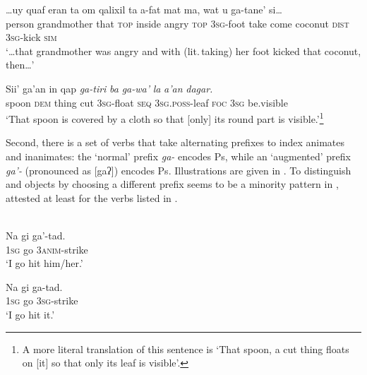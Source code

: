 \documentclass[output=paper]{LSP/langsci}
\begin{document}
\ex \label{03-kl-ex:12}
\gll \ldots uy quaf eran ta om qalixil ta\footnotemark {} a-fat mat ma, wat u ga-tane’ si\ldots \\
person grandmother that \textsc{top} inside angry \textsc{top} 3\textsc{sg}-foot take come coconut \textsc{dist} 3\textsc{sg}-kick \textsc{sim}\\
\clearpage
\glt ‘\ldots that grandmother was angry and with (lit.\,taking) her foot kicked that coconut, then\ldots’

\ex \label{03-kl-ex:13}
\gll Sii’ ga’an in qap \textit{ga-tiri} \textit{ba} \textit{ga-wa’} \textit{la} \textit{a’an} \textit{dagar.}\\
spoon \textsc{dem} thing cut 3\textsc{sg}-float \textsc{seq} 3\textsc{sg}.\textsc{poss}-leaf \textsc{foc} 3\textsc{sg} be.visible\\
\glt ‘That spoon is covered by a cloth so that [only] its round part is visible.’\footnote{A more literal translation of this sentence is ‘That spoon, a cut thing floats on [it] so that only its leaf is visible’.}
\z
\z

Second, there is a set of verbs that take alternating prefixes to index animates and inanimates: the ‘normal’ prefix \textit{ga-} encodes  Ps, while an ‘augmented’ prefix \textit{ga’-} (pronounced as [gaʔ]) encodes  Ps. 
Illustrations are given in . To distinguish  and  objects by choosing a different prefix seems to be a minority pattern in , attested at least for the verbs listed in .

\ea \label{03-kl-ex:14}
\ea \label{03-kl-ex:14a}
\\
\gll Na gi ga’-tad.\\
1\textsc{sg} go 3\textsc{anim}-strike\\
\glt ‘I go hit him/her.’

\ex
\label{03-kl-ex:14b}
\gll Na gi ga-tad.\\
1\textsc{sg} go 3\textsc{sg}-strike\\
\glt ‘I go hit it.’
\z
\z
\end{document}
